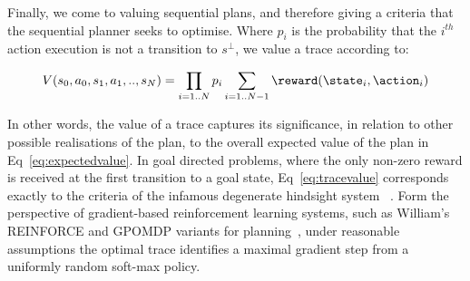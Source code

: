 

Finally, we come to valuing sequential plans, and therefore giving a
criteria that the sequential planner seeks to optimise. Where $p_i$
is the probability that the $i^{th}$ action execution is not a
transition to $s^\bot$, we value a trace according to:

\begin{equation}\label{eq:tracevalue}
V(s_0, a_0, s_1, a_1,.., s_N) =  \prod_{i=1..N} p_i \sum_{i=1..N-1} \reward(\state_i, \action_i)
\end{equation}

\noindent In other words, the value of a trace captures its
significance, in relation to other possible realisations of the plan,
to the overall expected value of the plan in
Eq~\ref{eq:expectedvalue}. In goal directed problems, where the only
non-zero reward is received at the first transition to a goal state,
Eq~\ref{eq:tracevalue} corresponds exactly to the criteria of the
infamous degenerate hindsight system
~\cite{yoon:etal:2007}. Form the perspective of
gradient-based reinforcement learning systems, such as William's
REINFORCE and GPOMDP variants for planning~\cite{olivier:doug:2009},
under reasonable assumptions the optimal trace identifies a maximal
gradient step from a uniformly random soft-max policy.





